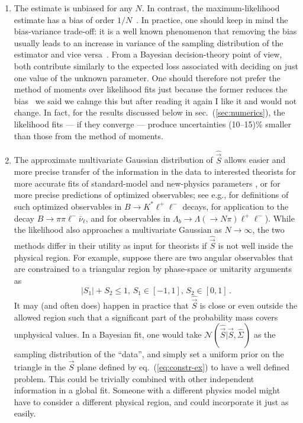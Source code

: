 \documentclass[aps,prd,reprint,nofootinbib,preprintnumbers]{revtex4}
\newcommand{\refeq}[1]{eq.~(\ref{eq:#1})}
\newcommand{\refsec}[1]{sec.~(\ref{sec:#1})}
\newcommand{\vecest}[1]{\widehat{\vec{#1}}}
\newcommand{\marcin}[1]{{\color{cyan}#1}}
\newcommand{\add}[1]{\textcolor{green!85!black}{#1}}
\begin{document}
\begin{enumerate}
\item The estimate is unbiased for any $N$. In contrast, the
  maximum-likelihood estimate has a bias of order
  $1/N$~\cite{Cox:1968}. In practice, one should keep in mind the
  bias-variance trade-off: it is a well known phenomenon that removing
  the bias usually leads to an increase in variance of the sampling
  distribution of the estimator and vice versa~\cite[sec. 7.3]{James:2006zz}. From a
  Bayesian decision-theory point of view, both contribute similarly to
  the expected loss associated with deciding on just one value of the
  unknown parameter. One should therefore not prefer the method of moments
  over likelihood fits just because the former reduces
  the bias~\cite[sections 13.8,17.2]{jaynes:2003} \marcin{we said we cahnge this but after reading it again I like it and would not change}. In fact, for
  the results discussed below in \refsec{numerics}, the likelihood
  fits --- if they converge --- produce uncertainties (10--15)\%
      smaller than those from the method of moments.
\item The approximate multivariate Gaussian distribution of $\vecest{S}$
    allows easier and more \add{precise} transfer of the information in the
  data to interested theorists for more accurate fits of
  standard-model and new-physics parameters \cite{Altmannshofer:2013foa,
Descotes-Genon:2013wba,Beaujean:2013soa},
  or for more precise predictions of optimized observables; see e.g.,
  \cite{Egede:2008uy,Egede:2010zc,Bobeth:2010wg,Becirevic:2011bp,
    Bobeth:2012vn,Matias:2012xw,DescotesGenon:2012zf} for definitions
  of such optimized observables in $B\to K^*\ell^+\ell^-$ decays,
  \cite{Faller:2013dwa} for application to the decay $B\to
  \pi\pi\ell^-\bar\nu_\ell$, and \cite{Boeer:2014xx} for observables
  in $\Lambda_b\to\Lambda(\to N\pi)\ell^+\ell^-$). While the
  likelihood also approaches a multivariate Gaussian as $N \to
  \infty$, the two methods differ in their utility as input for
  theorists if $\widehat{\vec{S}}$ is not well
  inside the physical region. For example, suppose there are two
  angular observables that are constrained to a triangular region by
  phase-space or unitarity arguments as
  \begin{equation}
    \label{eq:constr-ex}
    |S_1| + S_2 \le 1, \, S_1 \in [-1,1],\, S_2 \in [0,1] \,.
  \end{equation}
  It may (and often does) happen in practice that $\widehat{\vec{S}}$
  is close or even outside the allowed region such that a significant
  part of the probability mass covers unphysical values. In a Bayesian
  fit, one would take $\mathcal{N}(\vecest{S} | \vec{S},
  \widehat{\Sigma})$ as the sampling distribution of the ``data'', and
  simply set a uniform prior on the triangle in the $\vec{S}$ plane
  defined by \refeq{constr-ex} to have a well defined problem. This
  could be trivially combined with other independent information in a
  global fit. Someone with a different physics model might have to
  consider a
  different physical region, and could incorporate it just as easily.\\


\end{enumerate}
\end{document}
